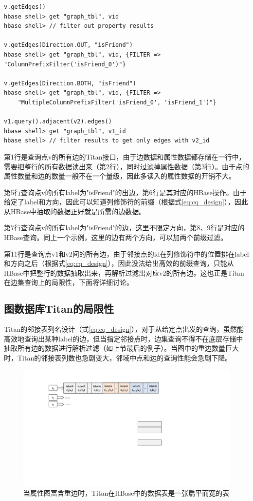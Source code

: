 \begin{lstlisting}
v.getEdges()
hbase shell> get "graph_tbl", vid
hbase shell> // filter out property results

v.getEdges(Direction.OUT, "isFriend")
hbase shell> get "graph_tbl", vid, {FILTER => "ColumnPrefixFilter('isFriend_0')"}

v.getEdges(Direction.BOTH, "isFriend")
hbase shell> get "graph_tbl", vid, {FILTER => 
    "MultipleColumnPrefixFilter('isFriend_0', 'isFriend_1')"}

v1.query().adjacent(v2).edges()
hbase shell> get "graph_tbl", v1_id
hbase shell> // filter results to get only edges with v2_id
\end{lstlisting}

第1行是查询点v的所有边的Titan接口，由于边数据和属性数据都存储在一行中，需要把整行的所有数据读出来（第2行），同时过滤掉属性数据（第3行）。由于点的属性数量和边的数量一般不在一个量级，因此多读入的属性数据的开销不大。

第5行查询点v的所有label为"isFriend"的出边，第6行是其对应的HBase操作。由于给定了label和方向，因此可以知道列修饰符的前缀（根据式\ref{eq:cq_design}），因此从HBase中抽取的数据正好就是所需的边数据。

第7行查询点v的所有label为"isFriend"的边，这里不限定方向，第8、9行是对应的HBase查询。同上一个示例，这里的边有两个方向，可以加两个前缀过滤。

第11行是查询点v1和v2间的所有边，由于邻接点的id在列修饰符中的位置排在label和方向之后（根据式\ref{eq:cq_design}），因此没法给出高效的前缀查询，只能从HBase中把整行的数据抽取出来，再解析过滤出对应v2的所有边。这也正是Titan在边集查询上的局限性，下面将详细讨论。

\subsection{图数据库Titan的局限性}
Titan的邻接表列名设计（式\ref{eq:cq_design}），对于从给定点出发的查询，虽然能高效地查询出某种label的边，但当指定邻接点时，边集查询不得不在底层存储中抽取所有边的数据进行解析过滤（如上节最后的例子）。当图中的重边数量巨大时，Titan的邻接表列数也急剧变大，邻域中点和边的查询性能会急剧下降。

\begin{figure}[htbp]
\centering
\includegraphics[width=150mm]{fig/original_list.pdf}
\caption{当属性图富含重边时，Titan在HBase中的数据表是一张扁平而宽的表}
\label{fig:orginal_list}
\end{figure}

